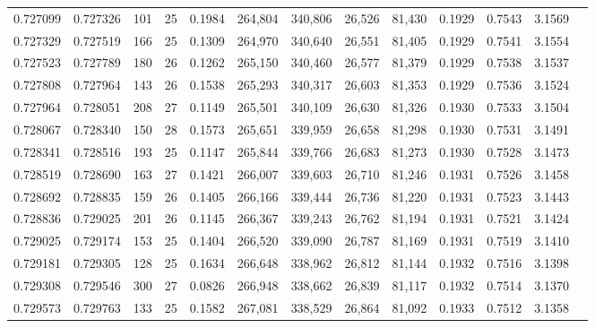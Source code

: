\begin{tabular}{rrrrrrrrrrrrr}
0.727099 & 0.727326 &   101 &  25 &                                     0.1984 & 264,804 & 340,806 &  26,526 &  81,430 & 0.1929 & 0.7543 & 3.1569 \\
0.727329 & 0.727519 &   166 &  25 &                                     0.1309 & 264,970 & 340,640 &  26,551 &  81,405 & 0.1929 & 0.7541 & 3.1554 \\
0.727523 & 0.727789 &   180 &  26 &                                     0.1262 & 265,150 & 340,460 &  26,577 &  81,379 & 0.1929 & 0.7538 & 3.1537 \\
0.727808 & 0.727964 &   143 &  26 &                                     0.1538 & 265,293 & 340,317 &  26,603 &  81,353 & 0.1929 & 0.7536 & 3.1524 \\
0.727964 & 0.728051 &   208 &  27 &                                     0.1149 & 265,501 & 340,109 &  26,630 &  81,326 & 0.1930 & 0.7533 & 3.1504 \\
0.728067 & 0.728340 &   150 &  28 &                                     0.1573 & 265,651 & 339,959 &  26,658 &  81,298 & 0.1930 & 0.7531 & 3.1491 \\
0.728341 & 0.728516 &   193 &  25 &                                     0.1147 & 265,844 & 339,766 &  26,683 &  81,273 & 0.1930 & 0.7528 & 3.1473 \\
0.728519 & 0.728690 &   163 &  27 &                                     0.1421 & 266,007 & 339,603 &  26,710 &  81,246 & 0.1931 & 0.7526 & 3.1458 \\
0.728692 & 0.728835 &   159 &  26 &                                     0.1405 & 266,166 & 339,444 &  26,736 &  81,220 & 0.1931 & 0.7523 & 3.1443 \\
0.728836 & 0.729025 &   201 &  26 &                                     0.1145 & 266,367 & 339,243 &  26,762 &  81,194 & 0.1931 & 0.7521 & 3.1424 \\
0.729025 & 0.729174 &   153 &  25 &                                     0.1404 & 266,520 & 339,090 &  26,787 &  81,169 & 0.1931 & 0.7519 & 3.1410 \\
0.729181 & 0.729305 &   128 &  25 &                                     0.1634 & 266,648 & 338,962 &  26,812 &  81,144 & 0.1932 & 0.7516 & 3.1398 \\
0.729308 & 0.729546 &   300 &  27 &                                     0.0826 & 266,948 & 338,662 &  26,839 &  81,117 & 0.1932 & 0.7514 & 3.1370 \\
0.729573 & 0.729763 &   133 &  25 &                                     0.1582 & 267,081 & 338,529 &  26,864 &  81,092 & 0.1933 & 0.7512 & 3.1358 \\

\end{tabular}
